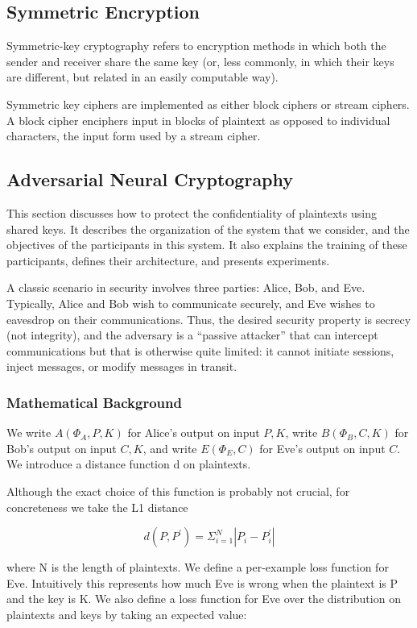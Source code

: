 \documentclass[a4paper]{article}
\begin{document}
    \subsection{Symmetric Encryption}
    Symmetric-key cryptography refers to encryption methods in which both the sender and 
    receiver share the same key (or, less commonly, in which their keys are different, but 
    related in an easily computable way).

    Symmetric key ciphers are implemented as either block ciphers or stream ciphers. 
    A block cipher enciphers input in blocks of plaintext as opposed to individual characters, 
    the input form used by a stream cipher.

    \subsection{Adversarial Neural Cryptography}
    This section discusses how to protect the confidentiality of plaintexts using shared keys. It describes
    the organization of the system that we consider, and the objectives of the participants in this system.
    It also explains the training of these participants, defines their architecture, and presents experiments.

    A classic scenario in security involves three parties: Alice, Bob, and Eve. Typically, Alice and Bob
    wish to communicate securely, and Eve wishes to eavesdrop on their communications. Thus, the
    desired security property is secrecy (not integrity), and the adversary is a “passive attacker” that
    can intercept communications but that is otherwise quite limited: it cannot initiate sessions, inject
    messages, or modify messages in transit.

      \subsubsection{Mathematical Background}
      We write $A(\Phi_{A}, P,K)$ for Alice’s output on input $P,K$, write $B(\Phi_{B},C,K)$ for Bob’s output on
      input $C,K$, and write $E(\Phi_{E},C)$ for Eve’s output on input $C$. We introduce a distance function d on
      plaintexts.  
      
      Although the exact choice of this function is probably not crucial, for concreteness we
      take the L1 distance 
        
      \[ d(P, P^\prime) = \Sigma_{i=1}^N | P_{i} - P_{i}^\prime | \]
      
      where N is the length of plaintexts. 
      We define a per-example loss function for Eve.
      Intuitively this represents how much Eve is wrong when the plaintext is P and the
      key is K. We also define a loss function for Eve over the distribution on plaintexts and keys by
      taking an expected value:
\end{document}

